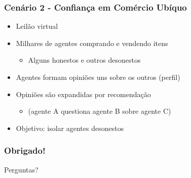 \documentclass[14pt]{beamer}
\begin{document}

\begin{frame}
	\frametitle{Cenário 2 - Confiança em Comércio Ubíquo}
	\begin{itemize}
		\item Leilão virtual
		\item Milhares de agentes comprando e vendendo itens
		\begin{itemize}
			\item Alguns honestos e outros desonestos
		\end{itemize}
		\item Agentes formam opiniões uns sobre os outros (perfil)
		\item Opiniões são expandidas por recomendação
		\begin{itemize}
			\item (agente A questiona agente B sobre agente C)
		\end{itemize}
		\item Objetivo: isolar agentes desonestos
	\end{itemize}
\end{frame}


\begin{frame}
  \frametitle{Obrigado!}
  Perguntas?
\end{frame}
\end{document}
